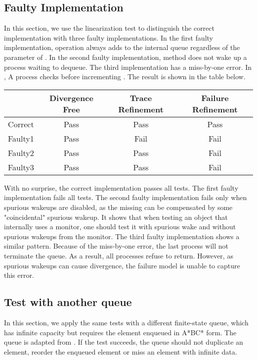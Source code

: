 \documentclass[a4paper, 12pt]{article}
\begin{document}
\subsection{Faulty Implementation}
In this section, we use the linearization test to distinguish the correct implementation with three faulty implementations. In the first faulty implementation,  operation always adds  to the internal queue regardless of the parameter of . In the second faulty implementation,  method  does not wake up a process waiting to dequeue. The third implementation has a miss-by-one error. In , A process checks  before incrementing . The result is shown in the table below.

\begin{tabular}{c c c c}
    \hline
    & Divergence Free & Trace Refinement & Failure Refinement \\ \hline
    Correct & Pass & Pass & Pass \\ \hline
    Faulty1 & Pass & Fail & Fail \\ \hline
    Faulty2 & Pass & Pass & Fail \\ \hline
    Faulty3 & Pass & Pass & Fail \\ \hline
\end{tabular}
\newline

With no surprise, the correct implementation passes all tests. The first faulty implementation fails all tests. The second faulty implementation fails only when spurious wakeups are disabled, as the missing  can be compensated by some "coincidental" spurious wakeup. It shows that when testing an object that internally uses a monitor, one should test it with spurious wake and without spurious wakeups from the monitor. The third faulty implementation shows a similar pattern. Because of the miss-by-one error, the last process will not terminate the queue. As a result, all processes refuse to return. However, as spurious wakeups can cause divergence, the failure model is unable to capture this error. 

\subsection{Test with another queue}
In this section, we apply the same tests with a different finite-state queue, which has infinite capacity but requires the element enqueued in A*BC* form. The queue is adapted from \cite{ABC}. If the test succeeds, the queue should not duplicate an element, reorder the enqueued element or miss an element with infinite data. 
\end{document}

